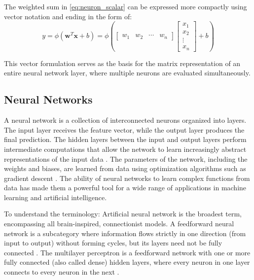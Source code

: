 The weighted sum in \autoref{eq:neuron_scalar} can be expressed more compactly using vector notation and ending in the form of:
\begin{equation}
    y = \phi\!\left(\mathbf{w}^T \mathbf{x} + b\right)
	= \phi\!\left(
        \begin{bmatrix}
            w_1 & w_2 & \cdots & w_n
        \end{bmatrix}
        \begin{bmatrix}
            x_1 \\
            x_2 \\
            \vdots \\
            x_n
        \end{bmatrix}
        + b
    \right) 
    \label{eq:single_neuron}
\end{equation}

This vector formulation serves as the basis for the matrix representation of an entire neural network layer, where multiple neurons are evaluated simultaneously.

\subsection{Neural Networks}
A neural network is a collection of interconnected neurons organized into layers. 
The input layer receives the feature vector, while the output layer produces the final prediction. The hidden layers between the input and output layers perform intermediate computations that allow the network to learn increasingly abstract representations of the input data \cite{Goodfellow-et-al-2016}.
The parameters of the network, including the weights and biases, are learned from data using optimization algorithms such as gradient descent \cite{Rumelhart1986LearningRB}. The ability of neural networks to learn complex functions from data has made them a powerful tool for a wide range of applications in machine learning and artificial intelligence.

To understand the terminology: Artificial neural network is the broadest term, encompassing all brain-inspired, connectionist models. A feedforward neural network is a subcategory where information flows strictly in one direction (from input to output) without forming cycles, but its layers need not be fully connected \cite{Goodfellow-et-al-2016}. The multilayer perceptron is a feedforward network with one or more fully connected (also called dense) hidden layers, where every neuron in one layer connects to every neuron in the next \cite{Goodfellow-et-al-2016}.

